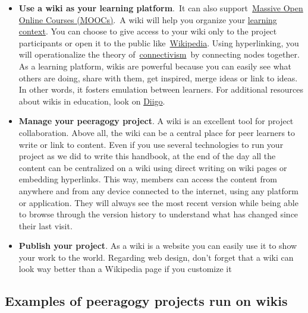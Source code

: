 \begin{itemize}
\tightlist
\item
  \textbf{Use a wiki as your learning platform}.~It can also
  support~\href{http://socialmediaclassroom.com/host/peeragogy/wiki/connectivism-practice-how-organize-a-mooc}{Massive
  Open Online Courses (MOOCs)}.~A wiki will help you organize your
  \href{http://socialmediaclassroom.com/host/peeragogy/wiki/organizing-a-learning-context}{learning
  context}. You can choose to give access to your wiki only to the
  project participants or open it to the public
  like~\href{http://www.wikipedia.org/}{Wikipedia}. Using hyperlinking,
  you will operationalize the theory
  of~\href{http://en.wikipedia.org/wiki/Connectivism}{connectivism}~by
  connecting nodes together. As a learning platform, wikis are powerful
  because you can easily see what others are doing, share with them, get
  inspired, merge ideas or link to ideas. In other words, it fosters
  emulation between learners. For additional resources about wikis in
  education, look on
  \href{http://www.diigo.com/user/regisb/wiki\%20education}{Diigo}.
\item
  \textbf{Manage your peeragogy project}. A wiki is an excellent tool
  for project collaboration. Above all, the wiki can be a central place
  for peer learners to write or link to content. Even if you use several
  technologies to run your project as we did to write this handbook, at
  the end of the day all the content can be centralized on a wiki using
  direct writing on wiki pages or embedding hyperlinks. This way,
  members can access the content from anywhere and from any device
  connected to the internet, using any platform or application. They
  will always see the most recent version while being able to browse
  through the version history to understand what has changed since their
  last visit.
\item
  \textbf{Publish your project}. As a wiki is a website you can easily
  use it to show your work to the world. Regarding web design, don't
  forget that a wiki can look way better than a Wikipedia page if you
  customize it
\end{itemize}

\hypertarget{examples-of-peeragogy-projects-run-on-wikis}{%
\subsection{Examples of peeragogy projects run on
wikis}\label{examples-of-peeragogy-projects-run-on-wikis}}

